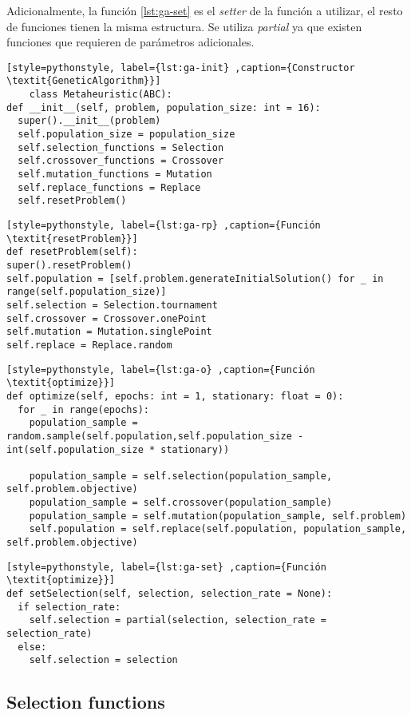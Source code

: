 Adicionalmente, la función \ref{lst:ga-set} es el \textit{setter} de la función a utilizar, el resto de funciones tienen la misma estructura. Se utiliza \textit{partial} ya que existen funciones que requieren de parámetros adicionales.

\begin{lstlisting}[style=pythonstyle, label={lst:ga-init} ,caption={Constructor  \textit{GeneticAlgorithm}}]
	class Metaheuristic(ABC):
def __init__(self, problem, population_size: int = 16):
  super().__init__(problem)
  self.population_size = population_size
  self.selection_functions = Selection
  self.crossover_functions = Crossover
  self.mutation_functions = Mutation
  self.replace_functions = Replace
  self.resetProblem()
\end{lstlisting}

\begin{lstlisting}[style=pythonstyle, label={lst:ga-rp} ,caption={Función  \textit{resetProblem}}]
def resetProblem(self):
super().resetProblem()
self.population = [self.problem.generateInitialSolution() for _ in range(self.population_size)]
self.selection = Selection.tournament
self.crossover = Crossover.onePoint
self.mutation = Mutation.singlePoint
self.replace = Replace.random
\end{lstlisting}

\begin{lstlisting}[style=pythonstyle, label={lst:ga-o} ,caption={Función  \textit{optimize}}]
def optimize(self, epochs: int = 1, stationary: float = 0):
  for _ in range(epochs):
    population_sample = random.sample(self.population,self.population_size - int(self.population_size * stationary))

    population_sample = self.selection(population_sample, self.problem.objective)
    population_sample = self.crossover(population_sample)
    population_sample = self.mutation(population_sample, self.problem)
    self.population = self.replace(self.population, population_sample, self.problem.objective) 
\end{lstlisting}

\begin{lstlisting}[style=pythonstyle, label={lst:ga-set} ,caption={Función  \textit{optimize}}]
def setSelection(self, selection, selection_rate = None):
  if selection_rate:
    self.selection = partial(selection, selection_rate = selection_rate)
  else:
    self.selection = selection
\end{lstlisting}

\subsection{Selection functions}

